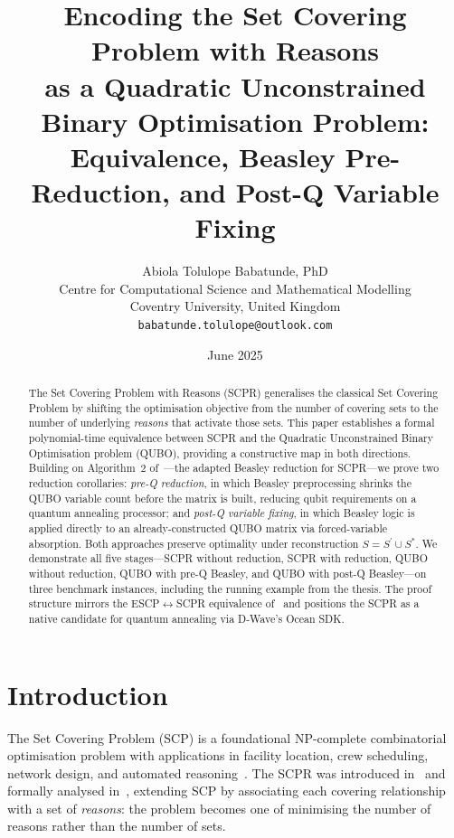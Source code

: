 \documentclass[11pt,a4paper]{article}
\title{%
  \textbf{\color{coventryblu}%
    Encoding the Set Covering Problem with Reasons\\
    as a Quadratic Unconstrained Binary Optimisation Problem:\\
    Equivalence, Beasley Pre-Reduction, and Post-Q Variable Fixing}
}
\author{%
  Abiola Tolulope Babatunde, PhD\\
  \small Centre for Computational Science and Mathematical Modelling\\
  \small Coventry University, United Kingdom\\
  \small \texttt{babatunde.tolulope@outlook.com}
}
\date{June 2025}
\theoremstyle{plain}
\theoremstyle{definition}
\theoremstyle{remark}
\newcommand{\Sstar}{S^{*}}
\newcommand{\Sprime}{S^{\prime}}
\newcommand{\SCPR}{\textup{SCPR}}
\newcommand{\QUBO}{\textup{QUBO}}
\newcommand{\SCP}{\textup{SCP}}
\newcommand{\ESCP}{\textup{ESCP}}
\begin{document}
\maketitle

\begin{abstract}
The Set Covering Problem with Reasons (\SCPR{}) generalises the classical Set Covering
Problem by shifting the optimisation objective from the number of covering sets to the
number of underlying \emph{reasons} that activate those sets.
This paper establishes a formal polynomial-time equivalence between \SCPR{} and the
Quadratic Unconstrained Binary Optimisation problem (\QUBO{}), providing a constructive
map in both directions.
Building on Algorithm~2 of~\cite{babatunde2025thesis}---the adapted Beasley reduction
for \SCPR{}---we prove two reduction corollaries:
\emph{pre-Q reduction}, in which Beasley preprocessing shrinks the \QUBO{} variable
count before the matrix is built, reducing qubit requirements on a quantum annealing
processor; and \emph{post-Q variable fixing}, in which Beasley logic is applied directly
to an already-constructed \QUBO{} matrix via forced-variable absorption.
Both approaches preserve optimality under reconstruction $S = \Sprime \cup \Sstar$.
We demonstrate all five stages---\SCPR{} without reduction, \SCPR{} with reduction,
\QUBO{} without reduction, \QUBO{} with pre-Q Beasley, and \QUBO{} with post-Q
Beasley---on three benchmark instances, including the running example from the thesis.
The proof structure mirrors the \ESCP{}$\leftrightarrow$\SCPR{} equivalence
of~\cite{babatunde2025thesis} and positions the \SCPR{} as a native candidate for
quantum annealing via D-Wave's Ocean SDK.
\end{abstract}

\tableofcontents
\newpage

\section{Introduction}
\label{sec:intro}

The Set Covering Problem (\SCP{}) is a foundational NP-complete combinatorial optimisation
problem with applications in facility location, crew scheduling, network design, and
automated reasoning~\cite{karp1972,beasley1987}.
The \SCPR{} was introduced in~\cite{sadeghimanesh2022smt} and formally analysed
in~\cite{babatunde2025thesis}, extending \SCP{} by associating each covering relationship
with a set of \emph{reasons}: the problem becomes one of minimising the number of reasons
rather than the number of sets.
\end{document}
